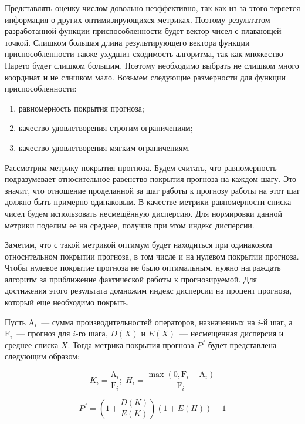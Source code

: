 \documentclass[times,specification,annotation]{itmo-student-thesis}
\begin{document}
Представлять оценку числом довольно неэффективно, так как из-за этого теряется информация о других оптимизирующихся метриках.
Поэтому результатом разработанной функции приспособленности будет вектор чисел с плавающей точкой.
Слишком большая длина результирующего вектора функции приспособленности также ухудшит сходимость алгоритма, так как множество Парето будет слишком большим.
Поэтому необходимо выбрать не слишком много координат и не слишком мало.
Возьмем следующие размерности для функции приспособленности:

\begin{enumerate}
    \item равномерность покрытия прогноза;
    \item качество удовлетворения строгим ограничениям;
    \item качество удовлетворения мягким ограничениям.
\end{enumerate}

Рассмотрим метрику покрытия прогноза.
Будем считать, что равномерность подразумевает относительное равенство покрытия прогноза на каждом шагу.
Это значит, что отношение проделанной за шаг работы к прогнозу работы на этот шаг должно быть примерно одинаковым.
В качестве метрики равномерности списка чисел будем использовать несмещённую дисперсию.
Для нормировки данной метрики поделим ее на среднее, получив при этом индекс дисперсии.

Заметим, что с такой метрикой оптимум будет находиться при одинаковом относительном покрытии прогноза, в том числе и на нулевом покрытии прогноза.
Чтобы нулевое покрытие прогноза не было оптимальным, нужно награждать алгоритм за приближение фактической работы к прогнозируемой.
Для достижения этого результата домножим индекс дисперсии на процент прогноза, который еще необходимо покрыть.

Пусть $\text{A}_i$~--- сумма производительностей операторов, назначенных на $i$-й шаг, а $\text{F}_i$~--- прогноз для $i$-го шага, $D(X)$ и $E(X)$~--- несмещенная дисперсия и среднее списка $X$.
Тогда метрика покрытия прогноза $P^f$ будет представлена следующим образом:

\begin{equation} K_i = \frac{\text{A}_i}{\text{F}_i};\; H_i = \frac{\max{\left( 0, \text{F}_i - \text{A}_i \right)}}{\text{F}_i} \end{equation}

\begin{equation} P^f = \left(1 + \frac{D(K)}{E(K)} \right) \left( 1 + E(H) \right) - 1 \end{equation}
\end{document}
